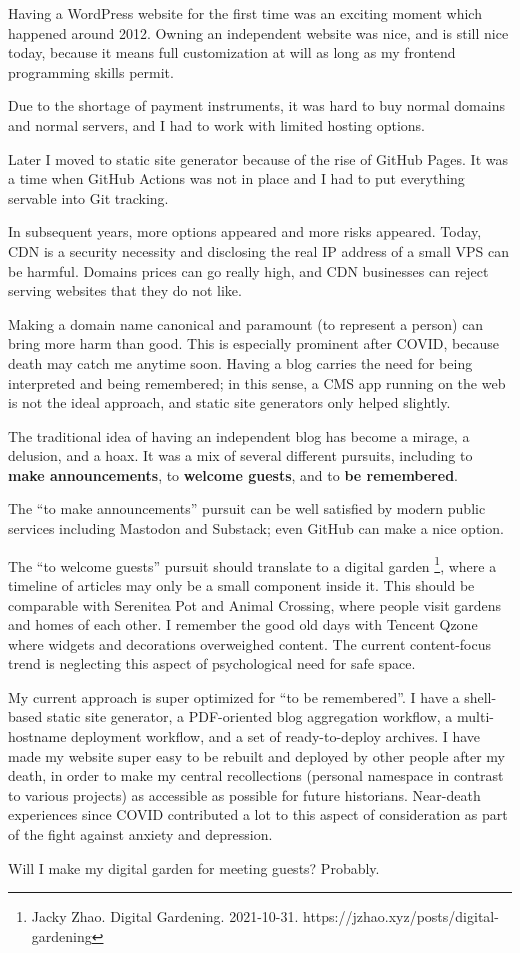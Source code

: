 
Having a WordPress website for the first time was an exciting moment which happened around 2012.
Owning an independent website was nice, and is still nice today,
because it means full customization at will as long as my frontend programming skills permit.

Due to the shortage of payment instruments, it was hard to buy normal domains and normal servers,
and I had to work with limited hosting options.

Later I moved to static site generator because of the rise of GitHub Pages.
It was a time when GitHub Actions was not in place and I had to put everything servable into Git tracking.

In subsequent years, more options appeared and more risks appeared.
Today, CDN is a security necessity and disclosing the real IP address of a small VPS can be harmful.
Domains prices can go really high, and CDN businesses can reject serving websites that they do not like.

Making a domain name canonical and paramount (to represent a person) can bring more harm than good.
This is especially prominent after COVID, because death may catch me anytime soon.
Having a blog carries the need for being interpreted and being remembered;
in this sense, a CMS app running on the web is not the ideal approach, and static site generators only helped slightly.

The traditional idea of having an independent blog has become a mirage, a delusion, and a hoax.
It was a mix of several different pursuits, including to \textbf{make announcements}, to \textbf{welcome guests}, and to \textbf{be remembered}.

The ``to make announcements'' pursuit can be well satisfied by modern public services including Mastodon and Substack;
even GitHub can make a nice option.

The ``to welcome guests'' pursuit should translate to a digital garden \footnote{Jacky Zhao. Digital Gardening. 2021-10-31. {https://jzhao.xyz/posts/digital-gardening}},
where a timeline of articles may only be a small component inside it.
This should be comparable with Serenitea Pot and Animal Crossing,
where people visit gardens and homes of each other.
I remember the good old days with Tencent Qzone where widgets and decorations overweighed content.
The current content-focus trend is neglecting this aspect of psychological need for safe space.

My current approach is super optimized for ``to be remembered''.
I have a shell-based static site generator, a PDF-oriented blog aggregation workflow,
a multi-hostname deployment workflow, and a set of ready-to-deploy archives.
I have made my website super easy to be rebuilt and deployed by other people after my death,
in order to make my central recollections (personal namespace in contrast to various projects)
as accessible as possible for future historians.
Near-death experiences since COVID contributed a lot to this aspect of consideration
as part of the fight against anxiety and depression.

Will I make my digital garden for meeting guests? Probably.

